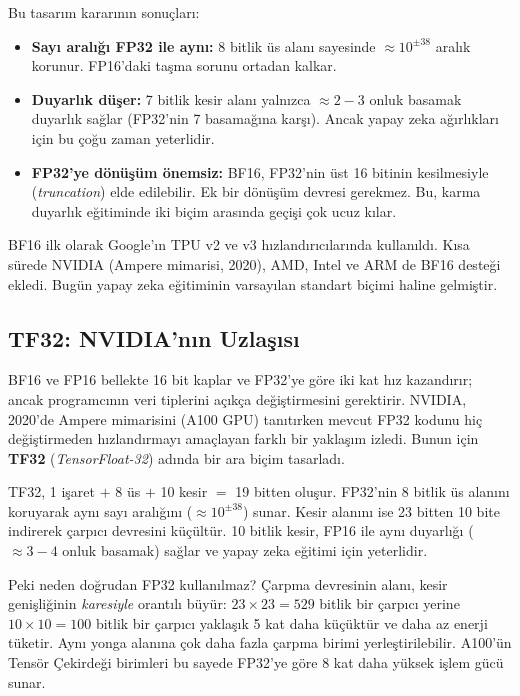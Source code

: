Bu tasarım kararının sonuçları:
\begin{itemize}
  \item \textbf{Sayı aralığı FP32 ile aynı:} 8 bitlik üs alanı sayesinde $\approx 10^{\pm 38}$ aralık korunur. FP16'daki taşma sorunu ortadan kalkar.
  \item \textbf{Duyarlık düşer:} 7 bitlik kesir alanı yalnızca $\approx 2{-}3$ onluk basamak duyarlık sağlar (FP32'nin 7 basamağına karşı). Ancak yapay zeka ağırlıkları için bu çoğu zaman yeterlidir.
  \item \textbf{FP32'ye dönüşüm önemsiz:} BF16, FP32'nin üst 16 bitinin kesilmesiyle (\emph{truncation}) elde edilebilir. Ek bir dönüşüm devresi gerekmez. Bu, karma duyarlık eğitiminde iki biçim arasında geçişi çok ucuz kılar.
\end{itemize}

BF16 ilk olarak Google'ın TPU v2 ve v3 hızlandırıcılarında kullanıldı. Kısa sürede NVIDIA (Ampere mimarisi, 2020), AMD, Intel ve ARM de BF16 desteği ekledi. Bugün yapay zeka eğitiminin varsayılan standart biçimi haline gelmiştir.

\subsection{TF32: NVIDIA'nın Uzlaşısı}

BF16 ve FP16 bellekte 16 bit kaplar ve FP32'ye göre iki kat hız kazandırır; ancak programcının veri tiplerini açıkça değiştirmesini gerektirir. NVIDIA, 2020'de Ampere mimarisini (A100 GPU) tanıtırken mevcut FP32 kodunu hiç değiştirmeden hızlandırmayı amaçlayan farklı bir yaklaşım izledi. Bunun için \textbf{TF32} (\emph{TensorFloat-32}) adında bir ara biçim tasarladı.

TF32, 1 işaret $+$ 8 üs $+$ 10 kesir $=$ 19 bitten oluşur. FP32'nin 8 bitlik üs alanını koruyarak aynı sayı aralığını ($\approx 10^{\pm 38}$) sunar. Kesir alanını ise 23 bitten 10 bite indirerek çarpıcı devresini küçültür. 10 bitlik kesir, FP16 ile aynı duyarlığı ($\approx 3{-}4$ onluk basamak) sağlar ve yapay zeka eğitimi için yeterlidir.

Peki neden doğrudan FP32 kullanılmaz? Çarpma devresinin alanı, kesir genişliğinin \emph{karesiyle} orantılı büyür: $23 \times 23 = 529$ bitlik bir çarpıcı yerine $10 \times 10 = 100$ bitlik bir çarpıcı yaklaşık 5 kat daha küçüktür ve daha az enerji tüketir. Aynı yonga alanına çok daha fazla çarpma birimi yerleştirilebilir. A100'ün Tensör Çekirdeği birimleri bu sayede FP32'ye göre 8 kat daha yüksek işlem gücü sunar.

